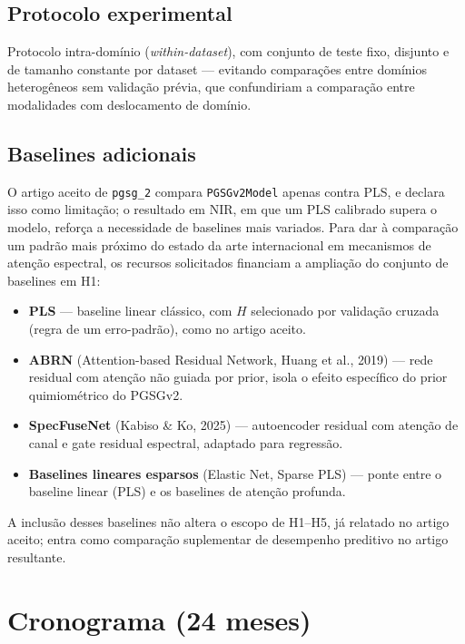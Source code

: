 \documentclass[11pt,a4paper]{article}
\begin{document}
\subsection{Protocolo experimental}
Protocolo intra-domínio (\emph{within-dataset}), com conjunto de teste fixo, disjunto e de tamanho constante por dataset --- evitando comparações entre domínios heterogêneos sem validação prévia, que confundiriam a comparação entre modalidades com deslocamento de domínio.

\subsection{Baselines adicionais}
\label{sec:baselines}
O artigo aceito de \texttt{pgsg\_2} compara \texttt{PGSGv2Model} apenas contra PLS, e declara isso como limitação; o resultado em NIR, em que um PLS calibrado supera o modelo, reforça a necessidade de baselines mais variados. Para dar à comparação um padrão mais próximo do estado da arte internacional em mecanismos de atenção espectral, os recursos solicitados financiam a ampliação do conjunto de baselines em H1:
\begin{itemize}
\item \textbf{PLS} --- baseline linear clássico, com $H$ selecionado por validação cruzada (regra de um erro-padrão), como no artigo aceito.
\item \textbf{ABRN} (Attention-based Residual Network, Huang et al., 2019) --- rede residual com atenção não guiada por prior, isola o efeito específico do prior quimiométrico do PGSGv2.
\item \textbf{SpecFuseNet} (Kabiso \& Ko, 2025) --- autoencoder residual com atenção de canal e gate residual espectral, adaptado para regressão.
\item \textbf{Baselines lineares esparsos} (Elastic Net, Sparse PLS) --- ponte entre o baseline linear (PLS) e os baselines de atenção profunda.
\end{itemize}
A inclusão desses baselines não altera o escopo de H1--H5, já relatado no artigo aceito; entra como comparação suplementar de desempenho preditivo no artigo resultante.

\section{Cronograma (24 meses)}
\end{document}
